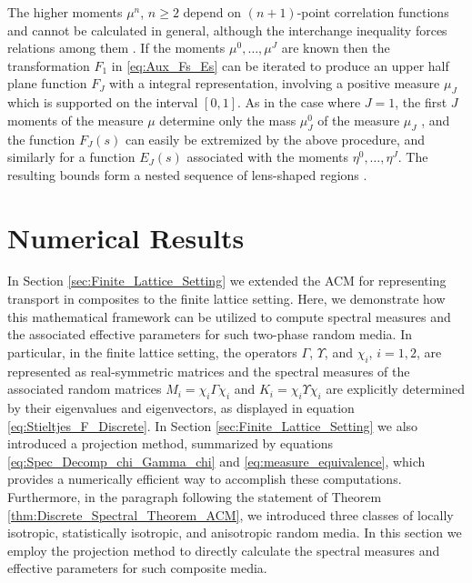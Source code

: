 \documentclass{cmslatex}
\begin{document}
The higher moments $\mu^n$, $n\geq2$ depend on $(n+1)$-point correlation
functions \cite{Golden:CMP-473} and cannot be calculated in general,
although the interchange inequality forces relations among them
\cite{Milton:JAP-5294}. If the moments $\mu^0,\ldots,\mu^J$ are known then the
transformation $F_1$ in \eqref{eq:Aux_Fs_Es} can be iterated to
produce an upper half plane function $F_J$ with a integral
representation, involving a positive measure $\mu_J$ which is supported
on the interval $[0,1]$. As in the case where $J=1$, the first $J$
moments of the measure $\mu$ determine only the mass $\mu_J^0$ of the
measure $\mu_J$ \cite{Golden:JMPS-333}, and the function $F_J(s)$ can
easily be extremized by the above procedure, and similarly for a
function $E_J(s)$ associated with the moments $\eta^0,\ldots,\eta^J$. The
resulting bounds form a nested sequence of lens-shaped regions
\cite{Golden:JMPS-333}.




\section{Numerical Results}\label{sec:Numerical_Results}
%
In Section \ref{sec:Finite_Lattice_Setting} we extended the ACM for
representing transport in composites to the finite lattice
setting. Here, we demonstrate how this mathematical 
framework can be utilized to compute spectral measures and the
associated effective parameters for such two-phase random media. In
particular, in the finite lattice setting, the operators $\Gamma$, $\Upsilon$, and 
$\chi_i$, $i=1,2$, are represented as real-symmetric matrices and the
spectral measures of the associated random matrices $M_i=\chi_i\Gamma\chi_i$ and 
$K_i=\chi_i\Upsilon\chi_i$ are explicitly determined by their eigenvalues and
eigenvectors, as displayed in equation
\eqref{eq:Stieltjes_F_Discrete}. In Section
\ref{sec:Finite_Lattice_Setting} we also introduced a projection method,
summarized by equations \eqref{eq:Spec_Decomp_chi_Gamma_chi} and
\eqref{eq:measure_equivalence}, which provides a numerically efficient
way to accomplish these computations. Furthermore, in the paragraph
following the statement of Theorem
\ref{thm:Discrete_Spectral_Theorem_ACM}, we introduced three 
classes of locally isotropic, statistically isotropic, and anisotropic
random media. In this section we employ the projection method to
directly calculate the spectral measures and effective parameters for
such composite media.
\end{document}
